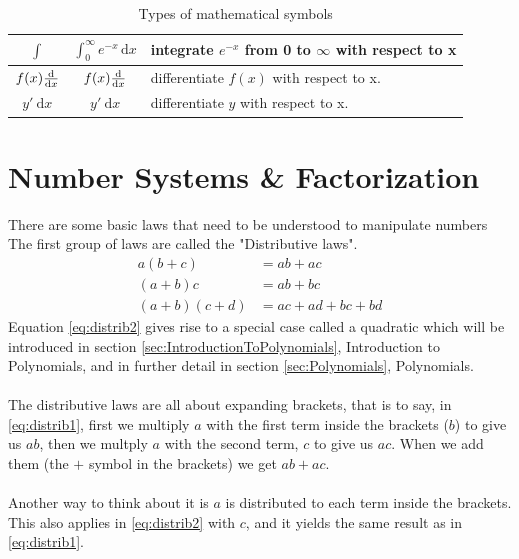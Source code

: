 \begin{table}[!htb]
\begin{tabularx}{\linewidth}{| c || c | X |}
  $ \int    $ & $ \int_0^\infty e^{-x}\,\mathrm{d}x $
                                & integrate $ e^{-x} $ from 0 to $ \infty $
                                with respect to x                     \\ \hline
  $ f(x)\frac{\mathrm{d}}{\mathrm{d}x} $ & $ f(x)\frac{\mathrm{d}}{\mathrm{d}x} $ & differentiate $f(x)$ with respect
                                            to x.                      \\ \hline
  $ y'~\mathrm{d}x $ & $ y'~\mathrm{d}x   $ & differentiate $y$ with respect to
                                            x.                         \\ \hline
\end{tabularx}
\caption{Types of mathematical symbols}
\end{table}
\newpage
\section{Number Systems \& Factorization}
\label{sec:NumberSystemsAndFactorization}
There are some basic laws that need to be understood to manipulate numbers
The first group of laws are called the "Distributive laws".
\begin{align}
      a(b+c) & = ab + ac \label{eq:distrib0} \\
      (a+b)c & = ab + bc \label{eq:distrib1} \\
  (a+b)(c+d) & = ac + ad + bc + bd \label{eq:distrib2}
\end{align}
Equation \ref{eq:distrib2} gives rise to a special case called a quadratic
which will be introduced in section \ref{sec:IntroductionToPolynomials},
Introduction to Polynomials, and in further detail in section
\ref{sec:Polynomials}, Polynomials.\\
\\
The distributive laws are all about expanding brackets, that is to say, in
\ref{eq:distrib1}, first we multiply $a$ with the first term inside the
brackets ($b$) to give us $ab$, then we multply $a$ with the second term, $c$
to give us $ac$. When we add them (the $+$ symbol in the brackets) we get
$ab + ac$.\\
\\
Another way to think about it is $a$ is distributed to each term inside the
brackets. This also applies in \ref{eq:distrib2} with $c$, and it yields the 
same result as in \ref{eq:distrib1}.
